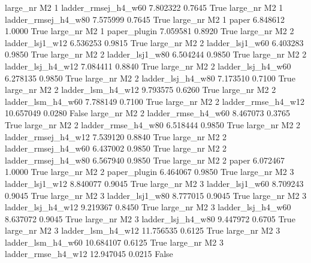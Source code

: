   large_nr       M2                 1 ladder_rmsej_h4_w60    7.802322      0.7645    True
  large_nr       M2                 1 ladder_rmsej_h4_w80    7.575999      0.7645    True
  large_nr       M2                 1               paper    6.848612      1.0000    True
  large_nr       M2                 1        paper_plugin    7.059581      0.8920    True
  large_nr       M2                 2     ladder_lsj1_w12    6.536253      0.9815    True
  large_nr       M2                 2     ladder_lsj1_w60    6.403283      0.9850    True
  large_nr       M2                 2     ladder_lsj1_w80    6.504244      0.9850    True
  large_nr       M2                 2   ladder_lsj_h4_w12    7.084411      0.8840    True
  large_nr       M2                 2   ladder_lsj_h4_w60    6.278135      0.9850    True
  large_nr       M2                 2   ladder_lsj_h4_w80    7.173510      0.7100    True
  large_nr       M2                 2   ladder_lsm_h4_w12    9.793575      0.6260    True
  large_nr       M2                 2   ladder_lsm_h4_w60    7.788149      0.7100    True
  large_nr       M2                 2  ladder_rmse_h4_w12   10.657049      0.0280   False
  large_nr       M2                 2  ladder_rmse_h4_w60    8.467073      0.3765    True
  large_nr       M2                 2  ladder_rmse_h4_w80    6.518444      0.9850    True
  large_nr       M2                 2 ladder_rmsej_h4_w12    7.539120      0.8840    True
  large_nr       M2                 2 ladder_rmsej_h4_w60    6.437002      0.9850    True
  large_nr       M2                 2 ladder_rmsej_h4_w80    6.567940      0.9850    True
  large_nr       M2                 2               paper    6.072467      1.0000    True
  large_nr       M2                 2        paper_plugin    6.464067      0.9850    True
  large_nr       M2                 3     ladder_lsj1_w12    8.840077      0.9045    True
  large_nr       M2                 3     ladder_lsj1_w60    8.709243      0.9045    True
  large_nr       M2                 3     ladder_lsj1_w80    8.777015      0.9045    True
  large_nr       M2                 3   ladder_lsj_h4_w12    9.219367      0.8450    True
  large_nr       M2                 3   ladder_lsj_h4_w60    8.637072      0.9045    True
  large_nr       M2                 3   ladder_lsj_h4_w80    9.447972      0.6705    True
  large_nr       M2                 3   ladder_lsm_h4_w12   11.756535      0.6125    True
  large_nr       M2                 3   ladder_lsm_h4_w60   10.684107      0.6125    True
  large_nr       M2                 3  ladder_rmse_h4_w12   12.947045      0.0215   False
